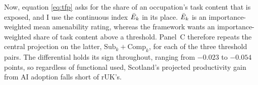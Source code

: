 Now, equation \eqref{eq:tfp} asks for the share of an occupation's task content that is exposed, and I use the continuous index $\bar{E}_k$ in its place. $\bar{E}_k$ is an importance-weighted mean amenability rating, whereas the framework wants an importance-weighted share of task content above a threshold. Panel~C therefore repeats the central projection on the latter, $\mathrm{Sub}_k + \mathrm{Comp}_k$, for each of the three threshold pairs. 
The differential holds its sign throughout, ranging from $-0.023$ to $-0.054$ points, so regardless of functional used, Scotland's projected productivity gain from AI adoption falls short of rUK's.


